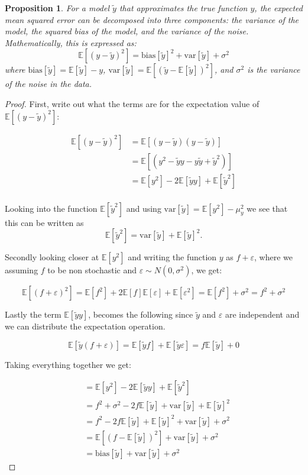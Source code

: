 \documentclass[amssymb,twocolumn,aps]{revtex4}
\newtheorem{prop}{Proposition}[section]
\begin{document}
\begin{prop}
For a model $\tilde{y}$ that approximates the true function $y$, the expected mean squared error can be decomposed into three components: the variance of the model, the squared bias of the model, and the variance of the noise. Mathematically, this is expressed as:
$$\mathbb{E}[(y-\tilde{y})^2] = \mathrm{bias}[\tilde{y}]^2 + \mathrm{var}[\tilde{y}] + \sigma^2$$
where $\mathrm{bias}[\tilde{y}] = \mathbb{E}[\tilde{y}] - y$, $\mathrm{var}[\tilde{y}] = \mathbb{E}[(\tilde{y} - \mathbb{E}[\tilde{y}])^2]$, and $\sigma^2$ is the variance of the noise in the data.
\end{prop}

\begin{proof}

First, write out what the terms are for the expectation value of $\mathbb{E}[(y-\tilde{y})^2]$:

\begin{align*}
\mathbb{E}[(y-\tilde{y})^2 ]&= \mathbb{E}[(y-\tilde{y}) (y-\tilde{y}) ] \\
&= \mathbb{E}[(y^2-\tilde{y} y -y \tilde{y} +\tilde{y}^2)] \\
&= \mathbb{E}[y^2] - 2 \mathbb{E}[\tilde{y} y] +\mathbb{E}[\tilde{y}^2] \\
\end{align*}

Looking into the function $\mathbb{E}[\tilde{y}^2]$ and using $\mathrm{var}[\tilde{y}] = \mathbb{E}[y^2] - \mu_y^2$ we see that this can be written as 
$$
\mathbb{E}[\tilde{y}^2] = \mathrm{var}[\tilde{y}] + \mathbb{E}[\tilde{y}]^2.
$$

Secondly looking closer at $\mathbb{E}[y^2]$ and writing the function $y$ as $f + \varepsilon$, where we assuming $f$ to be non stochastic and $\varepsilon \sim N(0, \sigma^2)$, we get:

$$
\mathbb{E}[(f+\varepsilon)^2] = \mathbb{E}[f^2] + 2 \mathbb{E}[f]\mathbb{E}[\varepsilon] + \mathbb{E}[\varepsilon^2] = \mathbb{E}[f^2] + \sigma^2 = f^2 + \sigma^2
$$

Lastly the term $\mathbb{E}[\tilde{y} y]$, becomes the following since $\tilde{y}$ and $\varepsilon$ are independent and we can distribute the expectation operation.

$$
\mathbb{E}[\tilde{y} (f + \varepsilon)] = \mathbb{E}[\tilde{y} f] + \mathbb{E}[\tilde{y} \varepsilon] = f \mathbb{E}[\tilde{y}] + 0
$$

Taking everything together we get:

\begin{align*}
&=\mathbb{E}[y^2] - 2 \mathbb{E}[\tilde{y} y] +\mathbb{E}[\tilde{y}^2] \\
&= f^2 + \sigma^2 - 2 f \mathbb{E}[\tilde{y}] +\mathrm{var}[\tilde{y}] + \mathbb{E}[\tilde{y}]^2 \\
&= f^2 - 2 f \mathbb{E}[\tilde{y}] + \mathbb{E}[\tilde{y}]^2 + \mathrm{var}[\tilde{y}] + \sigma^2 \\
&= \mathbb{E}[ (f - \mathbb{E}[\tilde{y}])^2] + \mathrm{var}[\tilde{y}] + \sigma^2 \\
&= \mathrm{bias}[\tilde{y}]  + \mathrm{var}[\tilde{y}] + \sigma^2 \
\end{align*}


\end{proof}
\end{document}
